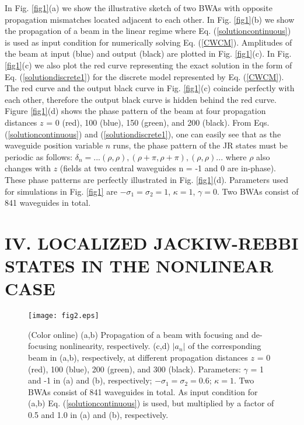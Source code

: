 \documentclass[twocolumn,aps, prl,showpacs]{revtex4}
\begin{document}
In Fig. \ref{fig1}(a) we show the illustrative sketch of two BWAs with opposite propagation mismatches located adjacent to each other. In Fig. \ref{fig1}(b) we show the propagation of a beam in the linear regime where Eq. (\ref{solutioncontinuous}) is used as input condition for numerically solving Eq. (\ref{CWCM}). Amplitudes of the beam at input (blue) and output (black) are plotted in Fig. \ref{fig1}(c). In Fig. \ref{fig1}(c) we  also plot the red curve representing the exact solution in the form of Eq.  (\ref{solutiondiscrete1}) for the discrete model represented by Eq. (\ref{CWCM}). The red curve and the output black curve in Fig. \ref{fig1}(c) coincide perfectly with each other, therefore the output black curve is hidden behind the red curve. Figure \ref{fig1}(d) shows the phase pattern of the beam at four propagation distances $z$ = 0 (red), 100 (blue), 150 (green), and 200 (black). From Eqs. (\ref{solutioncontinuous}) and (\ref{solutiondiscrete1}), one can easily see that as the waveguide position variable $n$ runs, the phase pattern of the JR states must be periodic as follows: $\delta_{n} = ... (\rho, \rho), (\rho + \pi, \rho + \pi), (\rho, \rho)...$ where $\rho$ also changes with $z$ (fields at two central waveguides n = -1 and 0 are in-phase). These phase patterns are perfectly illustrated in Fig. \ref{fig1}(d). Parameters used for simulations in Fig. \ref{fig1} are $-\sigma_{1} = \sigma_{2} = 1$, $\kappa = 1$, $\gamma = 0$. Two BWAs consist of 841 waveguides in total.



\section{IV. LOCALIZED JACKIW-REBBI STATES IN THE NONLINEAR CASE}
\label{nonlinearcase}

\begin{figure}[htb]
  \centering \texttt{[image: fig2.eps]}
\caption{\small{(Color online) (a,b) Propagation of a beam with focusing and de-focusing nonlinearity, respectively. (c,d) $|a_{n}|$ of the corresponding beam in (a,b), respectively, at different propagation distances $z$ = 0 (red), 100 (blue), 200 (green), and 300 (black). Parameters: $\gamma$ = 1 and -1 in (a) and (b), respectively; $-\sigma_{1} = \sigma_{2} = 0.6$; $\kappa = 1$. Two BWAs consist of 841 waveguides in total. As input condition for (a,b) Eq. (\ref{solutioncontinuous}) is used, but multiplied by a factor of 0.5 and 1.0 in (a) and (b), respectively.}}
  \label{fig2}
\end{figure}
\end{document}
